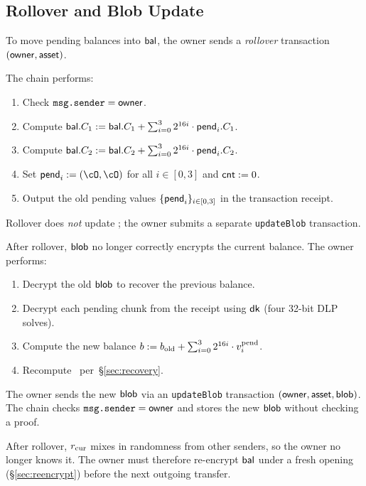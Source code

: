 \subsection{Rollover and Blob Update}
\label{sec:rollover}

To move pending balances into $\mathsf{bal}$, the owner sends a \emph{rollover} transaction $(\mathsf{owner}, \mathsf{asset})$.

The chain performs:
%
\begin{enumerate}[nosep]
    \item Check $\texttt{msg.sender} = \mathsf{owner}$.
    \item Compute $\mathsf{bal}.C_1 := \mathsf{bal}.C_1 + \sum_{i=0}^{3} 2^{16i} \cdot \mathsf{pend}_i.C_1$.
    \item Compute $\mathsf{bal}.C_2 := \mathsf{bal}.C_2 + \sum_{i=0}^{3} 2^{16i} \cdot \mathsf{pend}_i.C_2$.
    \item Set $\pending_i := (\cO, \cO)$ for all $i \in [0,3]$ and $\mathsf{cnt} := 0$.
    \item Output the old pending values $\{\mathsf{pend}_i\}_{i \in [0,3]}$ in the transaction receipt.
\end{enumerate}
%
Rollover does \emph{not} update \blob; the owner submits a separate \texttt{updateBlob} transaction.

\one 
{}
After rollover, $\mathsf{blob}$ no longer correctly encrypts the current balance. The owner performs:
%
\begin{enumerate}[nosep]
    \item Decrypt the old $\mathsf{blob}$ to recover the previous balance.
    \item Decrypt each pending chunk from the receipt using $\textsf{dk}$ (four 32-bit DLP solves).
    \item Compute the new balance $b := b_{\rm old} + \sum_{i=0}^{3} 2^{16i} \cdot v_i^{\rm pend}$.
    \item Recompute \blob\ per~\S\ref{sec:recovery}.
\end{enumerate}
%
The owner sends the new $\mathsf{blob}$ via an \texttt{updateBlob} transaction $(\mathsf{owner}, \mathsf{asset}, \mathsf{blob})$.
The chain checks $\texttt{msg.sender} = \mathsf{owner}$ and stores the new $\mathsf{blob}$ without checking a proof.

After rollover, $r_{\rm cur}$ mixes in randomness from other senders, so the owner no longer knows it.
The owner must therefore re-encrypt $\mathsf{bal}$ under a fresh opening (\S\ref{sec:reencrypt}) before the next outgoing transfer.
